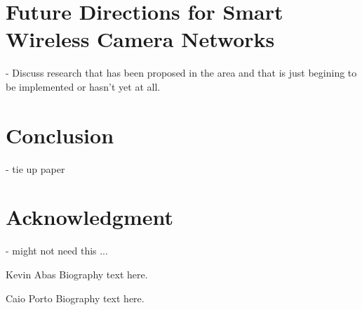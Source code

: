 \documentclass[journal,transmag]{IEEEtran}
\begin{document}
\section{Future Directions for Smart Wireless Camera Networks}
\-- Discuss research that has been proposed in the area and that is just begining to be implemented or hasn't yet at all.\\

\section{Conclusion}
\-- tie up paper

\section*{Acknowledgment}


\-- might not need this ...


\ifCLASSOPTIONcaptionsoff
  \newpage
\fi


%
%
%


\begin{IEEEbiographynophoto}{Kevin Abas}
Biography text here.
\end{IEEEbiographynophoto}

\begin{IEEEbiographynophoto}{Caio Porto}
Biography text here.
\end{IEEEbiographynophoto}
\end{document}

